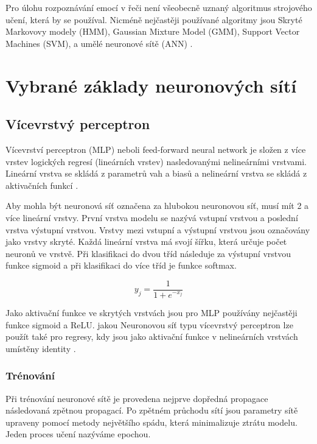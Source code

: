 \documentclass[FM,BP]{tulthesis}
\begin{document}
Pro úlohu rozpoznávání emocí v řeči není všeobecně uznaný algoritmus strojového učení, která by se používal. Nicméně nejčastěji používané algoritmy jsou Skryté Markovovy modely (HMM), Gaussian Mixture Model (GMM), Support Vector Machines (SVM), a umělé neuronové sítě (ANN) \cite{DBLP:journals/speech/AkcayO20}.

\chapter{Vybrané základy neuronových sítí}

\section{Vícevrstvý perceptron}
Vícevrství perceptron (MLP) neboli feed-forward neural network je složen z více vrstev logických regresí (lineárních vrstev) nasledovanými nelineárními vrstvami. Lineární vrstva se skládá z parametrů vah a biasů a nelineární vrstva se skládá z aktivačních funkcí \cite{DBLP:books/lib/Bishop07}.

Aby mohla být neuronová síť označena za hlubokou neuronovou síť, musí mít 2 a více lineární vrstvy. První vrstva modelu se nazývá vstupní vrstvou a poslední vrstva výstupní vrstvou. Vrstvy mezi vstupní a výstupní vrstvou jsou označovány jako vrstvy skryté. Každá lineární vrstva má svojí šířku, která určuje počet neuronů ve vrstvě. Při klasifikaci do dvou tříd následuje za výstupní vrstvou funkce sigmoid a při klasifikaci do více tříd je funkce softmax.

\begin{equation}
\label{eqn:sigmoid}
y_j =  \frac{\mathrm{1} }{\mathrm{1} + e^{-x_j} }
\end{equation}

Jako aktivační funkce ve skrytých vrstvách jsou pro MLP používány nejčastěji funkce sigmoid a ReLU. jakou Neuronovou síť typu vícevrstvý perceptron lze použít také pro regresy, kdy jsou jako aktivační funkce v nelineárních vrstvách umístěny identity \cite{DBLP:books/lib/Bishop07}.

\subsection{Trénování}
Při trénování neuronové sítě je provedena nejprve dopředná propagace následovaná zpětnou propagací. Po zpětném průchodu sítí jsou parametry sítě upraveny pomocí metody největšího spádu, která minimalizuje ztrátu modelu. Jeden proces učení nazýváme epochou.
\end{document}
